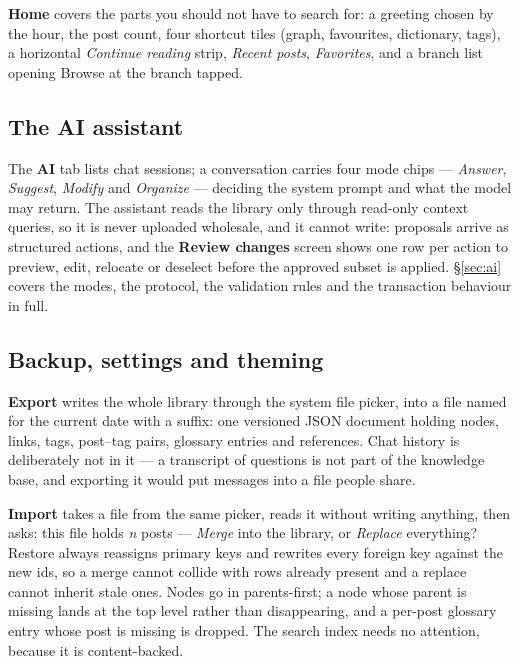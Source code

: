 \textbf{Home} covers the parts you should not have to search for: a greeting chosen by the hour, the
post count, four shortcut tiles (graph, favourites, dictionary, tags), a horizontal \emph{Continue
reading} strip, \emph{Recent posts}, \emph{Favorites}, and a branch list opening Browse at the
branch tapped.

\subsection{The AI assistant}

The \textbf{AI} tab lists chat sessions; a conversation carries four mode chips --- \emph{Answer},
\emph{Suggest}, \emph{Modify} and \emph{Organize} --- deciding the system prompt and what the model
may return. The assistant reads the library only through read-only context queries, so it is never
uploaded wholesale, and it cannot write: proposals arrive as structured actions, and the
\textbf{Review changes} screen shows one row per action to preview, edit, relocate or deselect
before the approved subset is applied. \S\ref{sec:ai} covers the modes, the protocol, the
validation rules and the transaction behaviour in full.

\subsection{Backup, settings and theming}

\textbf{Export} writes the whole library through the system file picker, into a file named for the
current date with a  suffix: one versioned JSON document holding nodes, links,
tags, post--tag pairs, glossary entries and references. Chat history is deliberately not in it ---
a transcript of questions is not part of the knowledge base, and exporting it would put messages
into a file people share.

\textbf{Import} takes a file from the same picker, reads it without writing anything, then asks:
this file holds \emph{n} posts --- \emph{Merge} into the library, or \emph{Replace} everything?
Restore always reassigns primary keys and rewrites every foreign key against the new ids, so a
merge cannot collide with rows already present and a replace cannot inherit stale ones. Nodes go
in parents-first; a node whose parent is missing lands at the top level rather than disappearing,
and a per-post glossary entry whose post is missing is dropped. The search index needs no
attention, because it is content-backed.

